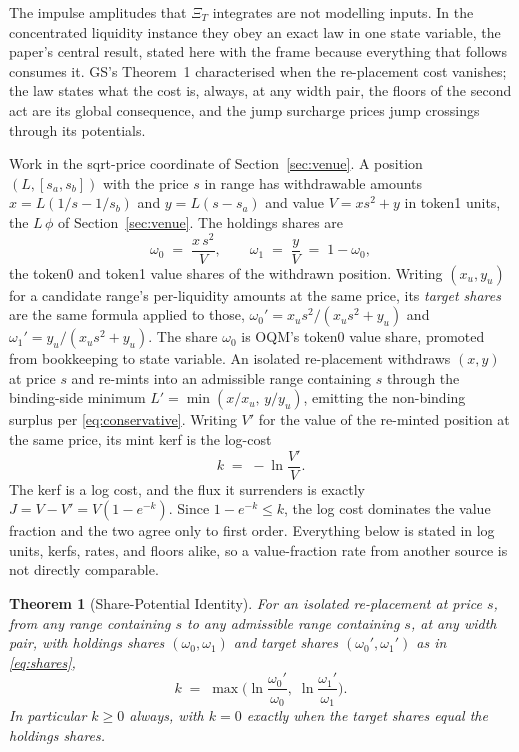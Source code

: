 \documentclass[11pt,a4paper]{article}
\theoremstyle{definition}
\theoremstyle{plain}
\newtheorem{theorem}{Theorem}
\theoremstyle{remark}
\begin{document}
The impulse amplitudes that $\Xi_T$ integrates are not modelling inputs. In the concentrated liquidity instance they obey an exact law in one state variable, the paper's central result, stated 
here with the frame because everything that follows consumes it. GS's Theorem~1 characterised when the re-placement cost vanishes; the law states what the cost is, always, at any width pair, 
the floors of the second act are its global consequence, and the jump surcharge prices jump crossings through its potentials.

Work in the sqrt-price coordinate of Section~\ref{sec:venue}. A position $(L, [s_a, s_b])$ with the price $s$ in range has withdrawable amounts $x = L(1/s - 1/s_b)$ and $y = L(s - s_a)$ and
value $V = x s^2 + y$ in token1 units, the $L\,\phi$ of Section~\ref{sec:venue}. The holdings shares are
\begin{equation}\label{eq:shares}
\omega_0 \;=\; \frac{x\,s^2}{V}, \qquad \omega_1 \;=\; \frac{y}{V}
\;=\; 1 - \omega_0,
\end{equation}
the token0 and token1 value shares of the withdrawn position. Writing $(x_u, y_u)$ for a candidate range's per-liquidity amounts at the same price, its \emph{target shares} are the same 
formula applied to those, $\omega_0' = x_u s^2/(x_u s^2 + y_u)$ and $\omega_1' = y_u/(x_us^2 + y_u)$. The share $\omega_0$ is OQM's token0 value share, promoted from bookkeeping to state variable. An
isolated re-placement withdraws $(x, y)$ at price $s$ and re-mints into an admissible range containing $s$ through the binding-side minimum $L' = \min(x/x_u,\, y/y_u)$, emitting the non-binding surplus
per \eqref{eq:conservative}. Writing $V'$ for the value of the re-minted position at the same price, its mint kerf is the log-cost
\begin{equation}\label{eq:kdef}
k \;=\; -\ln \frac{V'}{V} .
\end{equation}
The kerf is a log cost, and the flux it surrenders is exactly $J = V - V' = V(1 - e^{-k})$. Since $1 - e^{-k} \le k$, the log cost dominates the value fraction and the two agree only to first order.
Everything below is stated in log units, kerfs, rates, and floors alike, so a value-fraction rate from another source is not directly comparable.

\begin{theorem}[Share-Potential Identity]\label{thm:share}
For an isolated re-placement at price $s$, from any range containing $s$ to any admissible range containing $s$, at any width pair, with holdings shares $(\omega_0, \omega_1)$ and target shares
$(\omega_0', \omega_1')$ as in \eqref{eq:shares},
\begin{equation}\label{eq:shareid}
k \;=\; \max\!\Big( \ln \frac{\omega_0'}{\omega_0},\;
\ln \frac{\omega_1'}{\omega_1} \Big).
\end{equation}
In particular $k \ge 0$ always, with $k = 0$ exactly when the target shares equal the holdings shares.
\end{theorem}
\end{document}
